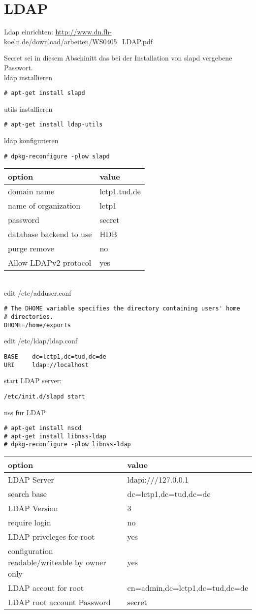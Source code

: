 \chapter{LDAP}
Ldap einrichten: \url{http://www.dn.fh-koeln.de/download/arbeiten/WS0405_LDAP.pdf}

Secret sei in diesem Abschinitt das bei der Installation von slapd vergebene Passwort.\\
ldap installieren
\begin{lstlisting}[style=Bash]
# apt-get install slapd
\end{lstlisting}
utils installieren
\begin{lstlisting}[style=Bash]
# apt-get install ldap-utils
\end{lstlisting}
ldap konfigurieren
\begin{lstlisting}[style=Bash]
# dpkg-reconfigure -plow slapd
\end{lstlisting}
\begin{tabular}{ l | l }
 option & value\\
 \hline
 domain name & lctp1.tud.de\\
 name of organization & lctp1\\
 password & secret\\
 database backend to use & HDB\\
 purge remove & no\\
 Allow LDAPv2 protocol & yes\\
\end{tabular}
\\
edit /etc/adduser.conf
\begin{lstlisting}[style=Bash]
# The DHOME variable specifies the directory containing users' home
# directories.
DHOME=/home/exports
\end{lstlisting}
edit /etc/ldap/ldap.conf 
\begin{lstlisting}[style=Bash]
BASE    dc=lctp1,dc=tud,dc=de
URI     ldap://localhost
\end{lstlisting}
start LDAP server:
\begin{lstlisting}[style=Bash]
/etc/init.d/slapd start
\end{lstlisting}
nss für LDAP
\begin{lstlisting}[style=Bash]
# apt-get install nscd
# apt-get install libnss-ldap
# dpkg-reconfigure -plow libnss-ldap
\end{lstlisting}
\begin{tabular}{ l | l }
 option & value\\
 \hline
 LDAP Server & ldapi:///127.0.0.1\\
 search base & dc=lctp1,dc=tud,dc=de\\
 LDAP Version & 3\\
 require login & no\\
 LDAP priveleges for root & yes\\
 configuration readable/writeable by owner only & yes\\
 LDAP accout for root & cn=admin,dc=lctp1,dc=tud,dc=de\\
 LDAP root account Password & secret\\
\end{tabular}
